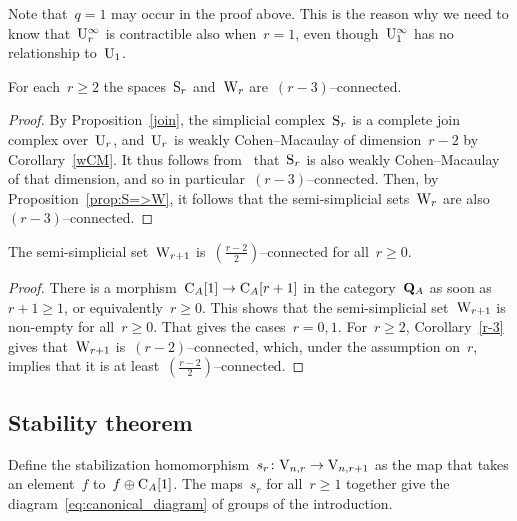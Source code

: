 Note that~$q=1$ may occur in the proof above. This is the reason why we need to know that~$\mathrm{U}_r^\infty$ is contractible also when~$r=1$, even though~$\mathrm{U}_1^\infty$ has no relationship to~$\mathrm{U}_1$.  

\begin{cor}\label{r-3}
For each~$r\geqslant2$ the spaces~$\mathrm{S}_{r}$ and~$\mathrm{W}_r$ are~$(r-3)$--connected. 
\end{cor}

\begin{proof}%
By Proposition~\ref{join}, the simplicial complex~$\mathrm{S}_r$ is a complete join complex over~$\mathrm{U}_r$, and~$\mathrm{U}_r$ is 
weakly Cohen--Macaulay of dimension~$r-2$ by Corollary~\ref{wCM}.  It thus follows from~\cite[Prop.~3.5]{Hatcher+Wahl} that~$\mathrm{S}_r$ is also weakly Cohen--Macaulay of that dimension, and so in particular~$(r-3)$--connected. 
Then, by Proposition~\ref{prop:S=>W}, it follows that the semi-simplicial sets~$\mathrm{W}_r$ are also~$(r-3)$--connected. 
\end{proof}

\begin{cor}\label{slope2}
The semi-simplicial set~$\mathrm{W}_{r+1}$ is~$(\frac{r-2}{2})$--connected for all~$r\geqslant0$. 
\end{cor}

\begin{proof}
There is a morphism~$\mathrm{C}_A[1]\to\mathrm{C}_A[r+1]$ in the category~$\mathbf{Q}_A$ as soon as~$r+1\geqslant1$, or equivalently~$r\geqslant0$. This shows that the semi-simplicial set~$\mathrm{W}_{r+1}$ is non-empty for all~$r\geqslant 0$. That gives the cases~\hbox{$r=0,1$}. For~\hbox{$r\geqslant2$}, Corollary~\ref{r-3} gives that~$\mathrm{W}_{r+1}$ is~$(r-2)$--connected, which, under the assumption on~$r$, implies that it is at least~$(\frac{r-2}{2})$--connected. 
\end{proof}




\subsection{Stability theorem}\label{sec:stabsubsec}

Define the stabilization homomorphism~$s_r\colon\mathrm{V}_{n,r}\to\mathrm{V}_{n,r+1}$ as the map that  takes an element~$f$ to~$f\oplus\mathrm{C}_A[1]$. 
The maps~$s_r$ for all~$r\ge 1$ together give the diagram~\eqref{eq:canonical_diagram} of groups of the introduction.

